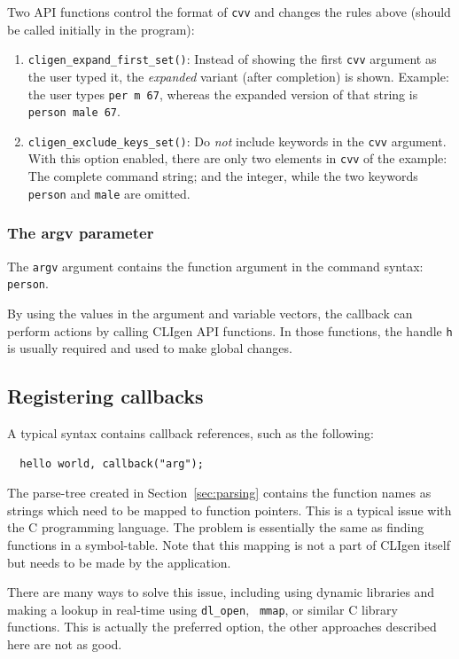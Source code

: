 \documentclass[a4paper, 10pt] {article}
\begin{document}
Two API functions control the format of {\tt cvv} and changes the rules above (should be called initially in the program):
\begin{enumerate}
\item {\tt cligen\_expand\_first\_set()}: Instead of showing the first {\tt cvv} argument as the user typed it, the \emph{expanded} variant (after completion) is shown. Example: the user types {\tt per m 67}, whereas the expanded version of that string is {\tt person male 67}.
\item {\tt cligen\_exclude\_keys\_set()}: Do \emph{not} include keywords in the {\tt cvv} argument. With this option enabled, there are only two elements in {\tt cvv} of the example: The complete command string; and the integer, while the two keywords {\tt person} and {\tt male} are omitted.
\end{enumerate}

\subsubsection{The argv parameter}

The {\tt argv} argument contains the function argument in the command syntax: {\tt person}.

By using the values in the argument and variable vectors, the callback
can perform actions by calling CLIgen API functions. In those
functions, the handle {\tt h} is usually required and used to make
global changes. 

\subsection{Registering callbacks}

A typical syntax contains callback references, such as the following:
\begin{verbatim}
  hello world, callback("arg");
\end{verbatim}

The parse-tree created in Section~\ref{sec:parsing} contains the
function names as strings which need to be mapped to function
pointers. This is a typical issue with the C programming language. The
problem is essentially the same as finding functions in a
symbol-table. Note that this mapping is not a part of CLIgen itself
but needs to be made by the application.

There are many ways to solve this issue, including using dynamic
libraries and making a lookup in real-time using {\tt dl\_open}, {\tt
  mmap}, or similar C library functions. This is actually the
preferred option, the other approaches described here are not as good.
\end{document}
